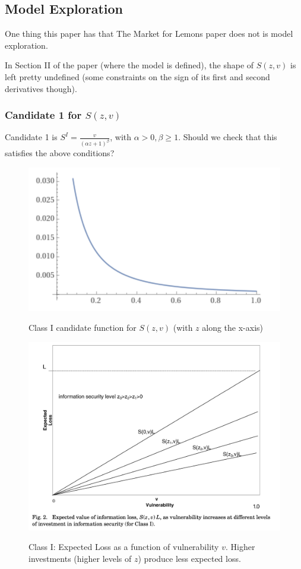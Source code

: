 \documentclass[11pt]{article}
\begin{document}
\subsection{Model Exploration}

One thing this paper has that The Market for Lemons paper does not is model exploration. 

In Section II of the paper (where the model is defined), the shape of $S(z,v)$ is left pretty undefined (some constraints on the sign of its first and second derivatives though).

\subsubsection{Candidate 1 for $S(z,v)$}

Candidate 1 is $S^I = \frac{v}{(\alpha z + 1)^\beta}$, with $\alpha > 0, \beta \geq 1$. Should we check that this satisfies the above conditions?

\begin{figure}[h]
    \centering
    \includegraphics*[width=4.5in]{class1.png}
    \label{fig:class1}
    \caption{Class I candidate function for $S(z,v)$ (with $z$ along the x-axis)}
\end{figure}
\FloatBarrier

\begin{figure}[h]
    \centering
    \includegraphics*[width=4.5in]{fig2.png}
    \label{fig:class1}
    \caption{Class I: Expected Loss as a function of vulnerability $v$. Higher investments (higher levels of $z$) produce less expected loss.}
\end{figure}
\FloatBarrier
\end{document}
